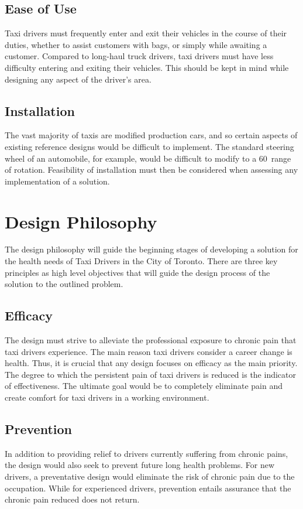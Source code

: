 \documentclass[11pt]{article}
\begin{document}
\subsection{Ease of Use}
\label{sec:ease}
Taxi drivers must frequently enter and exit their vehicles in the course of
their duties, whether to assist customers with bags, or simply while awaiting
a customer. Compared to long-haul truck drivers, taxi drivers must have less
difficulty entering and exiting their vehicles. This should be kept in mind
while designing any aspect of the driver's area.
\subsection{Installation}
\label{sec:installation}

The vast majority of taxis are modified production cars, %
and so certain aspects of existing reference designs would be difficult to
implement. The standard steering wheel of an automobile, for example,
would be difficult to modify to a 60\textdegree~range of
rotation\cite{Ismail2003}. Feasibility of installation must then
be considered when assessing any implementation of a solution.

\section{Design Philosophy}
\label{sec:philo}
The design philosophy will guide the beginning stages of developing a
solution for the health needs of Taxi Drivers in the City of
Toronto. There are three key principles as high level objectives that
will guide the design process of the solution to the outlined problem.
 
\subsection{Efficacy}
The design must strive to alleviate the professional exposure to
chronic pain that taxi drivers experience. The main reason taxi
drivers consider a career change is health. Thus, it is crucial that
any design focuses on efficacy as the main priority\cite{chicago}. The
degree to which the persistent pain of taxi drivers is reduced is the
indicator of effectiveness. The ultimate goal would be to completely
eliminate pain and create comfort for taxi drivers in a working
environment.
 
\subsection{Prevention}
In addition to providing relief to drivers currently suffering from
chronic pains, the design would also seek to prevent future long
health problems. For new drivers, a preventative design would
eliminate the risk of chronic pain due to the occupation. While for
experienced drivers, prevention entails assurance that the chronic
pain reduced does not return.
 
\end{document}
